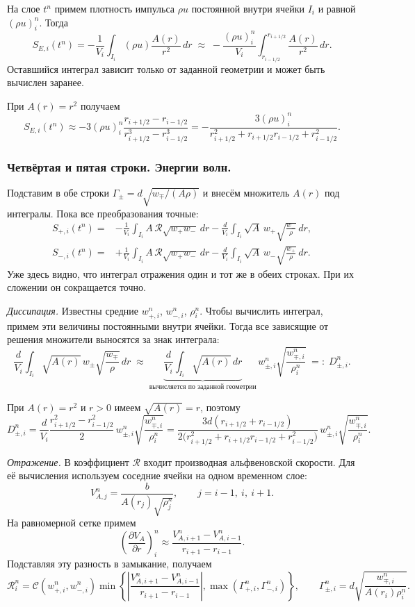 \documentclass[11pt,a4paper]{article}
\newcommand{\Rref}{\mathcal R}
\begin{document}
На слое $t^n$ примем плотность импульса $\rho u$
постоянной внутри ячейки $I_i$ и равной $(\rho u)_i^n$.
Тогда
\[
S_{E,i}(t^n)
=
-\frac{1}{V_i}\int_{I_i}(\rho u)\frac{A(r)}{r^2}\,dr
\;\approx\;
-\frac{(\rho u)_i^n}{V_i}
\int_{r_{i-1/2}}^{r_{i+1/2}}\frac{A(r)}{r^2}\,dr.
\]
Оставшийся интеграл зависит только от заданной геометрии
и может быть вычислен заранее.

При $A(r)=r^2$ получаем
\[
S_{E,i}(t^n)\approx
-3(\rho u)_i^n
\frac{r_{i+1/2}-r_{i-1/2}}
     {r_{i+1/2}^3-r_{i-1/2}^3}
=
-\frac{3(\rho u)_i^n}
{r_{i+1/2}^2+r_{i+1/2}r_{i-1/2}+r_{i-1/2}^2}.
\]

\subsubsection{Четвёртая и пятая строки. Энергии волн.}

Подставим в обе строки
$\Gamma_\pm=d\sqrt{w_\mp/(A\rho)}$ и внесём множитель $A(r)$
под интегралы. Пока все преобразования точные:
\begin{align*}
S_{+,i}(t^n)
={}&-\frac{1}{V_i}\int_{I_i}
 A\,\Rref\sqrt{w_+w_-}\,dr
-\frac{d}{V_i}\int_{I_i}
 \sqrt{A}\,w_+\sqrt{\frac{w_-}{\rho}}\,dr,
\\[3pt]
S_{-,i}(t^n)
={}&+\frac{1}{V_i}\int_{I_i}
 A\,\Rref\sqrt{w_+w_-}\,dr
-\frac{d}{V_i}\int_{I_i}
 \sqrt{A}\,w_-\sqrt{\frac{w_+}{\rho}}\,dr.
\end{align*}
Уже здесь видно, что интеграл отражения один и тот же
в обеих строках. При их сложении он сокращается точно.

\emph{Диссипация.}
Известны средние $w_{+,i}^n$, $w_{-,i}^n$, $\rho_i^n$.
Чтобы вычислить интеграл, примем эти величины постоянными
внутри ячейки. Тогда все зависящие от решения множители
выносятся за знак интеграла:
\[
\frac{d}{V_i}\int_{I_i}
\sqrt{A(r)}\,w_\pm\sqrt{\frac{w_\mp}{\rho}}\,dr
\;\approx\;
\underbrace{\frac{d}{V_i}\int_{I_i}\sqrt{A(r)}\,dr}
_{\text{вычисляется по заданной геометрии}}
\,w_{\pm,i}^n\sqrt{\frac{w_{\mp,i}^n}{\rho_i^n}}
\;=:\;D_{\pm,i}^n.
\]

При $A(r)=r^2$ и $r>0$ имеем $\sqrt{A(r)}=r$, поэтому
\[
D_{\pm,i}^n
=
\frac{d}{V_i}
\frac{r_{i+1/2}^2-r_{i-1/2}^2}{2}
\,w_{\pm,i}^n\sqrt{\frac{w_{\mp,i}^n}{\rho_i^n}}
=
\frac{3d(r_{i+1/2}+r_{i-1/2})}
{2\bigl(r_{i+1/2}^2+r_{i+1/2}r_{i-1/2}+r_{i-1/2}^2\bigr)}
\,w_{\pm,i}^n\sqrt{\frac{w_{\mp,i}^n}{\rho_i^n}}.
\]

\emph{Отражение.}
В коэффициент $\Rref$ входит производная альфвеновской
скорости. Для её вычисления используем соседние ячейки
на одном временном слое:
\[
V_{A,j}^n=\frac{b}{A(r_j)\sqrt{\rho_j^n}},
\qquad j=i-1,\ i,\ i+1.
\]
На равномерной сетке примем
\[
\left(\frac{\partial V_A}{\partial r}\right)_i^n
\approx
\frac{V_{A,i+1}^n-V_{A,i-1}^n}{r_{i+1}-r_{i-1}}.
\]
Подставляя эту разность в замыкание, получаем
\[
\Rref_i^n=
\mathcal C(w_{+,i}^n,w_{-,i}^n)
\min\!\left\{
\left|\frac{V_{A,i+1}^n-V_{A,i-1}^n}{r_{i+1}-r_{i-1}}\right|,
\max(\Gamma_{+,i}^n,\Gamma_{-,i}^n)
\right\},
\qquad
\Gamma_{\pm,i}^n
=d\sqrt{\frac{w_{\mp,i}^n}{A(r_i)\rho_i^n}}.
\]
\end{document}
